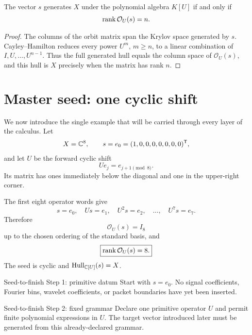 \begin{theorem}\label{thm:orbit-rank}
The vector $s$ generates $X$ under the polynomial algebra $K[U]$ if and only if
\[
\operatorname{rank}\mathcal O_U(s)=n.
\]
\end{theorem}

\begin{proof}
The columns of the orbit matrix span the Krylov space generated by $s$.  Cayley--Hamilton reduces every power $U^m$, $m\ge n$, to a linear combination of $I,U,\ldots,U^{n-1}$.  Thus the full generated hull equals the column space of $\mathcal O_U(s)$, and this hull is $X$ precisely when the matrix has rank $n$.
\end{proof}

\section{Master seed: one cyclic shift}
We now introduce the single example that will be carried through every layer of the calculus.  Let
\[
X=\mathbb C^8,
\qquad
s=e_0=(1,0,0,0,0,0,0,0)^{\mathsf T},
\]
and let $U$ be the forward cyclic shift
\[
Ue_j=e_{j+1\pmod 8}.
\]
Its matrix has ones immediately below the diagonal and one in the upper-right corner.

\begin{calculationbox}[ orbit]
The first eight operator words give
\[
s=e_0,
\quad Us=e_1,
\quad U^2s=e_2,
\quad\ldots,\quad
U^7s=e_7.
\]
Therefore
\[
\mathcal O_U(s)=I_8
\]
up to the chosen ordering of the standard basis, and
\[
\boxed{\operatorname{rank}\mathcal O_U(s)=8.}
\]
The seed is cyclic and $\operatorname{Hull}_{\mathbb C[U]}(s)=X$.
\end{calculationbox}



\begin{stepbox}{Seed-to-finish Step 1: primitive datum}
Start with $s=e_0$.  No signal coefficients, Fourier bins, wavelet coefficients, or packet boundaries have yet been inserted.
\end{stepbox}

\begin{stepbox}{Seed-to-finish Step 2: fixed grammar}
Declare one primitive operator $U$ and permit finite polynomial expressions in $U$.  The target vector introduced later must be generated from this already-declared grammar.
\end{stepbox}

